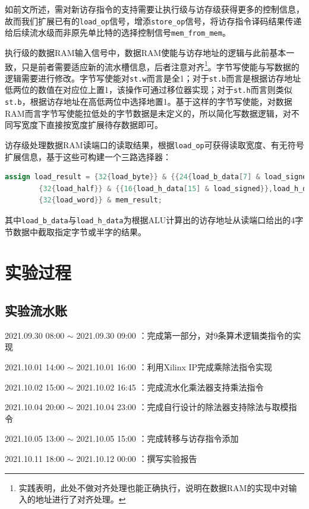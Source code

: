 \documentclass[UTF-8,twoside,c5size]{ctexart}
\begin{document}
	如前文所述，需对新访存指令的支持需要让执行级与访存级获得更多的控制信息，故而我们扩展已有的\texttt{load\_op}信号，增添\texttt{store\_op}信号，将访存指令译码结果传递给后续流水级而非原先单比特的选择控制信号\texttt{mem\_from\_mem}。
	
	执行级的数据RAM输入信号中，数据RAM使能与访存地址的逻辑与此前基本一致，只是前者需要适应新的流水槽信息，后者注意对齐\footnote{实践表明，此处不做对齐处理也能正确执行，说明在数据RAM的实现中对输入的地址进行了对齐处理。}。字节写使能与写数据的逻辑需要进行修改。字节写使能对\texttt{st.w}而言是全1；对于\texttt{st.b}而言是根据访存地址低两位的数值在对应位上置1，该操作可通过移位器实现；对于\texttt{st.h}而言则类似\texttt{st.b}，根据访存地址在高低两位中选择地置1。基于这样的字节写使能，对数据RAM而言字节写使能拉低处的字节数据是未定义的，所以简化写数据逻辑，对不同写宽度下直接按宽度扩展待存数据即可。
	
	访存级处理数据RAM读端口的读取结果，根据\texttt{load\_op}可获得读取宽度、有无符号扩展信息，基于这些可构建一个三路选择器：
	\begin{lstlisting}[language=verilog]
assign load_result = {32{load_byte}} & {{24{load_b_data[7] & load_signed}},load_b_data} |
		{32{load_half}} & {{16{load_h_data[15] & load_signed}},load_h_data} |
		{32{load_word}} & mem_result;
	\end{lstlisting}
	其中\texttt{load\_b\_data}与\texttt{load\_h\_data}为根据ALU计算出的访存地址从读端口给出的4字节数据中截取指定字节或半字的结果。
	
	\section{实验过程}
	
	\subsection{实验流水账}
	
	2021.09.30 08:00 $\sim$ 2021.09.30 09:00 ：完成第一部分，对9条算术逻辑类指令的实现
	
	2021.10.01 14:00 $\sim$ 2021.10.01 16:00 ：利用Xilinx IP完成乘除法指令实现
	
	2021.10.02 15:00 $\sim$ 2021.10.02 16:45 ：完成流水化乘法器支持乘法指令
	
	2021.10.04 20:00 $\sim$ 2021.10.04 23:00 ：完成自行设计的除法器支持除法与取模指令
	
	2021.10.05 13:00 $\sim$ 2021.10.05 15:00 ：完成转移与访存指令添加
	
	2021.10.11 18:00 $\sim$ 2021.10.12 00:00 ：撰写实验报告
	
\end{document}
